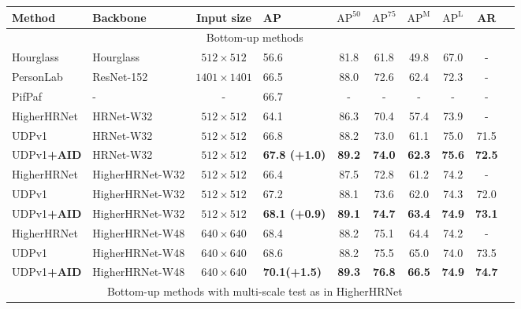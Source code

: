 \documentclass[final]{cvpr}
\begin{document}
\begin{table*}
\footnotesize
\begin{center}
\begin{tabular}{l|l|c|lcccccc}

\hline
Method                           & Backbone       &Input size      &AP   & $\text{AP}^{50}$ & $\text{AP}^{75}$ & $\text{AP}^{\text{M}}$ &$\text{AP}^{\text{L}}$ &AR  \\
\hline
\multicolumn{9}{c}{Bottom-up methods}\\
\hline
Hourglass \cite{AssociativeEmbedding}& Hourglass   &$512\times512$    &56.6                  & 81.8              & 61.8         & 49.8          &67.0           &-   \\
PersonLab \cite{PersonLab}         & ResNet-152    &$1401\times1401$  &66.5                  & 88.0              & 72.6         & 62.4          &72.3           &-\\
PifPaf \cite{PIFPAF}               & -             &-                 &66.7                  & -                 & -            &-              &-              &-    \\
HigherHRNet \cite{Higher}          & HRNet-W32     &$512\times512$    &64.1                  & 86.3              & 70.4         & 57.4          &73.9           &-\\
UDPv1 \cite{UDP}                   & HRNet-W32     &$512\times512$    &66.8                  & 88.2              & 73.0         & 61.1          &75.0           &71.5\\
UDPv1\textbf{+AID}                & HRNet-W32     &$512\times512$    &\textbf{67.8 (+1.0)}   &\textbf{89.2}      &\textbf{74.0} &\textbf{62.3}  &\textbf{75.6}  &\textbf{72.5}\\
HigherHRNet \cite{Higher}          &HigherHRNet-W32&$512\times512$    &66.4                  & 87.5              & 72.8         & 61.2          &74.2           &-\\
UDPv1 \cite{UDP}                   &HigherHRNet-W32&$512\times512$    &67.2                  & 88.1              & 73.6         & 62.0          &74.3           &72.0\\
UDPv1\textbf{+AID}                &HigherHRNet-W32&$512\times512$    &\textbf{68.1 (+0.9)}   &\textbf{89.1}      &\textbf{74.7} &\textbf{63.4}  &\textbf{74.9}  &\textbf{73.1}\\
HigherHRNet \cite{Higher}          &HigherHRNet-W48&$640\times640$    &68.4                  & 88.2              & 75.1         & 64.4          &74.2           &-\\
UDPv1\cite{UDP}                   &HigherHRNet-W48&$640\times640$    &68.6                  & 88.2              & 75.5         & 65.0          &74.0           &73.5\\
UDPv1\textbf{+AID}                &HigherHRNet-W48&$640\times640$    &\textbf{70.1(+1.5)}   &\textbf{89.3}      &\textbf{76.8} &\textbf{66.5}  &\textbf{74.9}  &\textbf{74.7}\\
\hline
\multicolumn{9}{c}{Bottom-up methods with multi-scale test as in HigherHRNet \cite{Higher}}\\
\hline


\end{tabular}
\end{center}
\end{table*}
\end{document}
